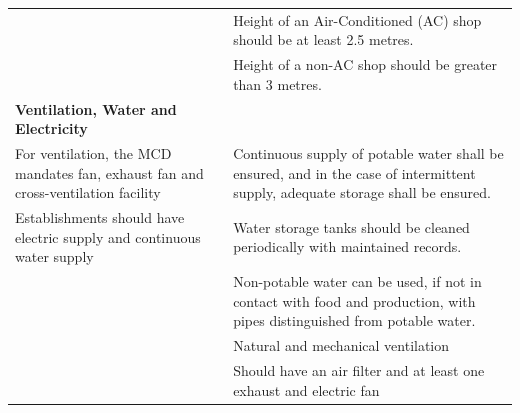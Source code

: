 \documentclass[a4paper, 12pt, twoside]{article}
\newcommand\tabitem{\makebox[1em][r]{\textbullet~}}
\begin{document}
\begin{longtable}[l]{>{\raggedright}p{6.5cm}>{\raggedright\arraybackslash}p{8.5cm}}
		&	\newline{} \tabitem Height of an Air-Conditioned (AC) shop should be at least 2.5 metres.\\
		&	 \newline{} \tabitem Height of a non-AC shop should be greater than 3 metres.\\
    \midrule
 \textbf{Ventilation, Water and Electricity}	&	\\
    \midrule
 \tabitem   For ventilation, the MCD mandates fan, exhaust fan and cross-ventilation facility	&	 
 \tabitem Continuous supply of potable water shall be ensured, and in the case of intermittent supply, adequate storage shall be ensured.\\
\newline{} \tabitem Establishments should have electric supply and continuous water supply	&	\newline{} \tabitem Water storage tanks should be cleaned periodically with maintained records.\\
	&	\newline{} \tabitem Non-potable water can be used, if not in contact with food and production, with pipes distinguished from potable water.\\
	&	\newline{} \tabitem Natural and mechanical ventilation\\
	&	\newline{} \tabitem Should have an air filter and at least one exhaust and electric fan\\
\midrule
    

\end{longtable}
\end{document}
